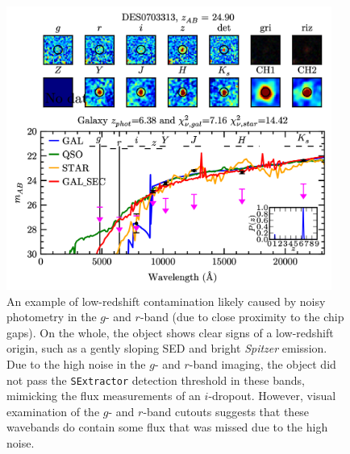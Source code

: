 \begin{figure}[tb]
\centering
\includegraphics[width=0.95\textwidth]{Chapter4/Figs/DES0703313_thesis.png}
\caption[Example of low-redshift contamination due to \texorpdfstring{$g$}{}-band and \texorpdfstring{$r$}{}-band  noise]{An example of  low-redshift contamination likely caused by noisy photometry in the $g$- and $r$-band (due to close proximity to the chip gaps). On the whole, the object shows clear signs of a low-redshift origin, such as a gently sloping SED and bright \textit{Spitzer} emission. Due to the high noise in the $g$- and $r$-band imaging, the object did not pass the \texttt{SExtractor} detection threshold in these bands, mimicking the flux measurements of an $i$-dropout. However, visual examination of the $g$- and $r$-band cutouts suggests that these wavebands do contain some flux that was missed due to the high noise.}
\label{fig:example_g_noise}
\end{figure}


